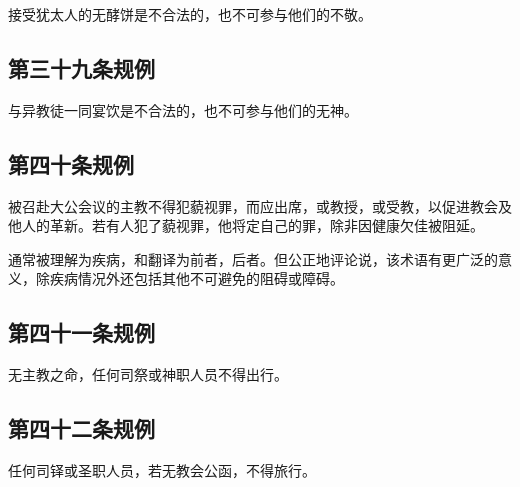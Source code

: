 接受犹太人的无酵饼是不合法的，也不可参与他们的不敬。\par


\subsection{第三十九条规例}

与异教徒一同宴饮是不合法的，也不可参与他们的无神。\par


\subsection{第四十条规例}

被召赴大公会议的主教不得犯藐视罪，而应出席，或教授，或受教，以促进教会及他人的革新。若有人犯了藐视罪，他将定自己的罪，除非因健康欠佳被阻延。\par

\par

通常被理解为疾病，和翻译为前者，后者。但公正地评论说，该术语有更广泛的意义，除疾病情况外还包括其他不可避免的阻碍或障碍。\par


\subsection{第四十一条规例}

无主教之命，任何司祭或神职人员不得出行。\par


\subsection{第四十二条规例}

任何司铎或圣职人员，若无教会公函，不得旅行。\par

